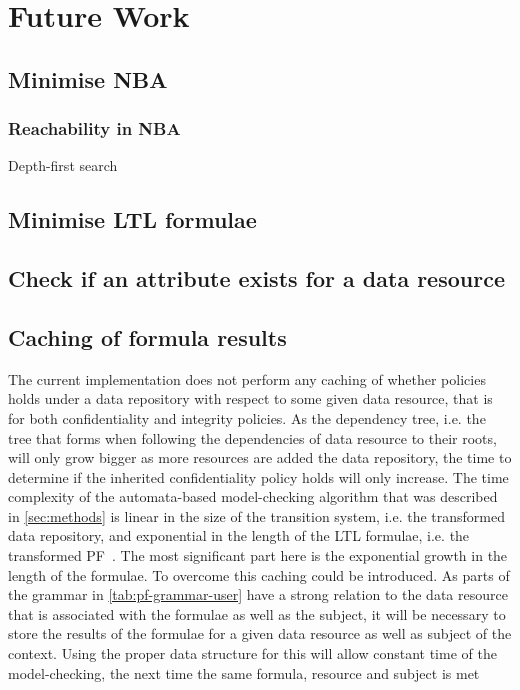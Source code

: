 \section{Future Work}\label{sec:future-work}
\subsection{Minimise NBA}
\cite{fritz2002state, hopcroft1971n, kan2016partial}
\subsubsection{Reachability in NBA}
Depth-first search
\subsection{Minimise LTL formulae}

\subsection{Check if an attribute exists for a data resource}

\subsection{Caching of formula results}
The current implementation does not perform any caching of whether policies holds under a data repository with respect to some given data resource, that is for both confidentiality and integrity policies. As the dependency tree, i.e. the tree that forms when following the dependencies of data resource to their roots, will only grow bigger as more resources are added the data repository, the time to determine if the inherited confidentiality policy holds will only increase. The time complexity of the automata-based model-checking algorithm that was described in \autoref{sec:methods} is linear in the size of the transition system, i.e. the transformed data repository, and exponential in the length of the LTL formulae, i.e. the transformed PF~\cite{baier2008principles}. The most significant part here is the exponential growth in the length of the formulae. To overcome this caching could be introduced. As parts of the grammar in \autoref{tab:pf-grammar-user} have a strong relation to the data resource that is associated with the formulae as well as the subject, it will be necessary to store the results of the formulae for a given data resource as well as subject of the context. Using the proper data structure for this will allow constant time of the model-checking, the next time the same formula, resource and subject is met 
